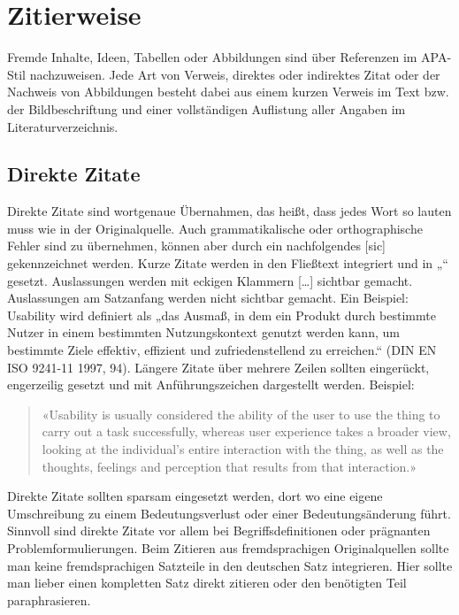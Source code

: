 \section{Zitierweise}\label{subsec:zitierweise}

Fremde Inhalte, Ideen, Tabellen oder Abbildungen sind über Referenzen im APA-Stil nachzuweisen. Jede Art von Verweis, direktes oder indirektes Zitat oder der Nachweis von Abbildungen besteht dabei aus einem kurzen Verweis im Text bzw. der Bildbeschriftung und einer vollständigen Auflistung aller Angaben im Literaturverzeichnis.

\subsection{Direkte Zitate}\label{subsubsec:direkte}

Direkte Zitate sind wortgenaue Übernahmen, das heißt, dass jedes Wort so lauten muss wie in der Originalquelle. Auch grammatikalische oder orthographische Fehler sind zu übernehmen, können aber durch ein nachfolgendes [sic] gekennzeichnet werden. Kurze Zitate werden in den Fließtext integriert und in „“ gesetzt. Auslassungen werden mit eckigen Klammern […] sichtbar gemacht. Auslassungen am Satzanfang werden nicht sichtbar gemacht. Ein Beispiel: Usability wird definiert als „das Ausmaß, in dem ein Produkt durch bestimmte Nutzer in einem bestimmten Nutzungskontext genutzt werden kann, um bestimmte Ziele effektiv, effizient und zufriedenstellend zu erreichen.“ (DIN EN ISO 9241-11 1997, 94). Längere Zitate über mehrere Zeilen sollten eingerückt, engerzeilig gesetzt und mit Anführungszeichen dargestellt werden. Beispiel:


\begin{quote}
«Usability is usually considered the ability of the user to use the thing to carry out a task successfully, whereas user experience takes a broader view, looking at the individual’s entire interaction with the thing, as well as the thoughts, feelings and perception that results from that interaction.»
\cite[S. 4]{albert2013measuring}
\end{quote}

Direkte Zitate sollten sparsam eingesetzt werden, dort wo eine eigene Umschreibung zu einem Bedeutungsverlust oder einer Bedeutungsänderung führt. Sinnvoll sind direkte Zitate vor allem bei Begriffsdefinitionen oder prägnanten Problemformulierungen. Beim Zitieren aus fremdsprachigen Originalquellen sollte man keine fremdsprachigen Satzteile  in den deutschen Satz integrieren. Hier sollte man lieber einen kompletten Satz direkt zitieren oder den benötigten Teil paraphrasieren.

